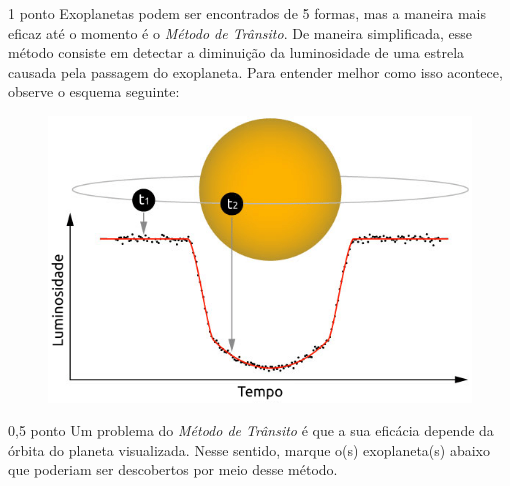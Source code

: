 \documentclass{../lista}
\begin{document}
	\begin{questao}{1 ponto}
		Exoplanetas podem ser encontrados de 5 formas, mas a maneira mais eficaz até o momento é o \textit{Método de Trânsito}. De maneira simplificada, esse método consiste em detectar a diminuição da luminosidade de uma estrela causada pela passagem do exoplaneta. Para entender melhor como isso acontece, observe o esquema seguinte:
		\begin{figure}[H]
			\centering
			\includegraphics[scale=0.7]{./img/5a.png}
		\end{figure}

		\begin{pergunta}{0,5 ponto}
			Um problema do \textit{Método de Trânsito} é que a sua eficácia depende da órbita do planeta visualizada. Nesse sentido, marque o(s) exoplaneta(s) abaixo que poderiam ser descobertos por meio desse método.



\end{pergunta}
\end{questao}
\end{document}
